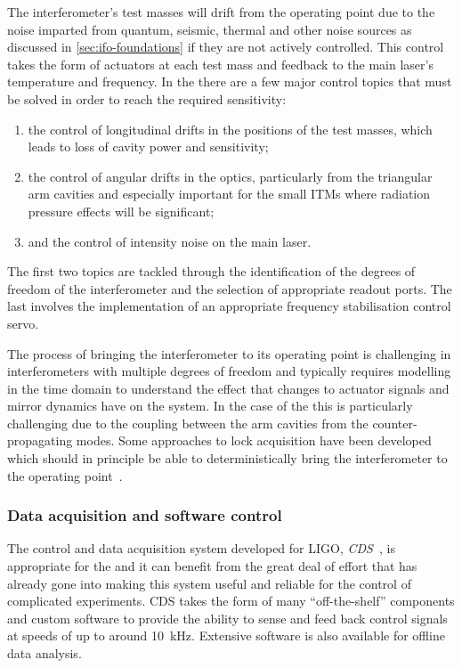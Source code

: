 The interferometer's test masses will drift from the operating point due to the noise imparted from quantum, seismic, thermal and other noise sources as discussed in \cref{sec:ifo-foundations} if they are not actively controlled. This control takes the form of actuators at each test mass and feedback to the main laser's temperature and frequency. In the \SSMEXPT{} there are a few major control topics that must be solved in order to reach the required sensitivity:
\begin{enumerate}
  \item the control of longitudinal drifts in the positions of the test masses, which leads to loss of cavity power and sensitivity;
  \item the control of angular drifts in the optics, particularly from the triangular arm cavities and especially important for the small \glspl{ITM} where radiation pressure effects will be significant;
  \item and the control of intensity noise on the main laser.
\end{enumerate}
The first two topics are tackled through the identification of the degrees of freedom of the interferometer and the selection of appropriate readout ports. The last involves the implementation of an appropriate frequency stabilisation control servo.

The process of bringing the interferometer to its operating point is challenging in interferometers with multiple degrees of freedom and typically requires modelling in the time domain to understand the effect that changes to actuator signals and mirror dynamics have on the system. In the case of the \SSMEXPT{} this is particularly challenging due to the coupling between the arm cavities from the counter-propagating modes. Some approaches to lock acquisition have been developed which should in principle be able to deterministically bring the interferometer to the operating point~\cite{Glaefke2015}.

\subsubsection{\label{sec:cds}Data acquisition and software control}
The control and data acquisition system developed for \gls{LIGO}, \emph{\gls{CDS}}~\cite{Bork2010}, is appropriate for the \SSMEXPT{} and it can benefit from the great deal of effort that has already gone into making this system useful and reliable for the control of complicated experiments. \gls{CDS} takes the form of many ``off-the-shelf'' components and custom software to provide the ability to sense and feed back control signals at speeds of up to around \SI{10}{\kilo\hertz}. Extensive software is also available for offline data analysis.

